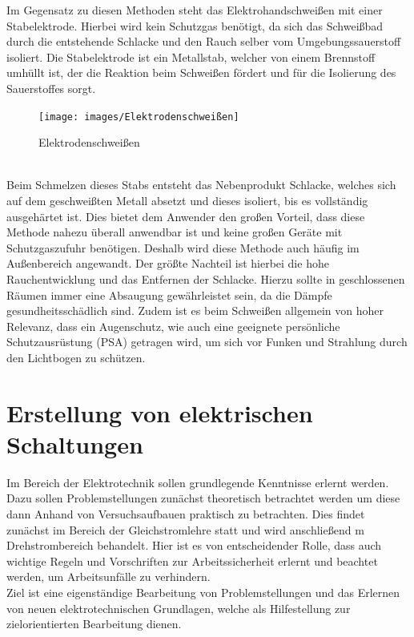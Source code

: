 Im Gegensatz zu diesen Methoden steht das Elektrohandschweißen mit
einer Stabelektrode. Hierbei wird kein Schutzgas benötigt, da sich das Schweißbad durch die entstehende Schlacke und den Rauch selber vom 
Umgebungssauerstoff isoliert. Die Stabelektrode ist ein Metallstab, welcher von einem Brennstoff umhüllt ist, der die Reaktion beim Schweißen fördert und 
für die Isolierung des Sauerstoffes sorgt.
\begin{figure}[h]
    \centering
    \texttt{[image: images/Elektrodenschweißen]}
    \caption[Elektrodenschweißen]{Elektrodenschweißen \autocite{E-Hand}}
    \label{fig:Elektrodenschweißen}
\end{figure}
\\Beim Schmelzen dieses Stabs entsteht das Nebenprodukt Schlacke, welches sich auf dem geschweißten Metall 
absetzt und dieses isoliert, bis es vollständig ausgehärtet ist.  Dies bietet dem Anwender den großen Vorteil, dass diese Methode nahezu überall anwendbar
ist und keine großen Geräte mit Schutzgaszufuhr benötigen. Deshalb wird diese Methode auch häufig im Außenbereich angewandt. Der größte Nachteil ist 
hierbei die hohe Rauchentwicklung und das Entfernen der Schlacke. Hierzu sollte in geschlossenen Räumen immer eine Absaugung gewährleistet sein, da die
Dämpfe gesundheitsschädlich sind.  Zudem ist es beim Schweißen allgemein von hoher Relevanz, dass ein Augenschutz, wie auch eine geeignete persönliche 
Schutzausrüstung (PSA) getragen wird, um sich vor Funken und Strahlung durch den Lichtbogen zu schützen. \autocite{Spath.2023}
\clearpage


\section{Erstellung von elektrischen Schaltungen}

Im Bereich der Elektrotechnik sollen grundlegende Kenntnisse erlernt werden. Dazu sollen Problemstellungen zunächst theoretisch 
betrachtet werden um diese dann Anhand von Versuchsaufbauen praktisch zu betrachten. Dies findet zunächst im Bereich der Gleichstromlehre statt und 
wird anschließend m Drehstrombereich behandelt. Hier ist es von entscheidender Rolle, dass auch wichtige Regeln und Vorschriften zur Arbeitssicherheit 
erlernt und beachtet werden, um Arbeitsunfälle zu verhindern.
\\
Ziel ist eine eigenständige Bearbeitung von Problemstellungen und das Erlernen von neuen elektrotechnischen Grundlagen, welche als Hilfestellung zur 
zielorientierten Bearbeitung dienen. 
\clearpage

